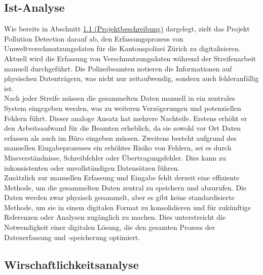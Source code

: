 \documentclass[a4paper,12pt]{article}
\begin{document}
\subsection{Ist-Analyse}
\label{sec:Ist-Analyse}
Wie bereits in Abschnitt \hyperref[sec:projektbeschreibung]{1.1 (Projektbeschreibung)} dargelegt, zielt das Projekt \glqq Pollution Detection\grqq{} darauf ab, den Erfassungsprozess von Umweltverschmutzungsdaten für die Kantonspolizei Zürich zu digitalisieren. Aktuell wird die Erfassung von Verschmutzungsdaten während der Streifenarbeit manuell durchgeführt. Die Polizeibeamten notieren die Informationen auf physischen Datenträgern, was nicht nur zeitaufwendig, sondern auch fehleranfällig ist.\\
Nach jeder Streife müssen die gesammelten Daten manuell in ein zentrales System eingegeben werden, was zu weiteren Verzögerungen und potenziellen Fehlern führt. Dieser analoge Ansatz hat mehrere Nachteile. Erstens erhöht er den Arbeitsaufwand für die Beamten erheblich, da sie sowohl vor Ort Daten erfassen als auch im Büro eingeben müssen. Zweitens besteht aufgrund des manuellen Eingabeprozesses ein erhöhtes Risiko von Fehlern, sei es durch Missverständnisse, Schreibfehler oder Übertragungsfehler. Dies kann zu inkonsistenten oder unvollständigen Datensätzen führen.\\
Zusätzlich zur manuellen Erfassung und Eingabe fehlt derzeit eine effiziente Methode, um die gesammelten Daten zentral zu speichern und abzurufen. Die Daten werden zwar physisch gesammelt, aber es gibt keine standardisierte Methode, um sie in einem digitalen Format zu konsolidieren und für zukünftige Referenzen oder Analysen zugänglich zu machen. Dies unterstreicht die Notwendigkeit einer digitalen Lösung, die den gesamten Prozess der Datenerfassung und -speicherung optimiert.

\subsection{Wirschaftlichkeitsanalyse}
\end{document}
